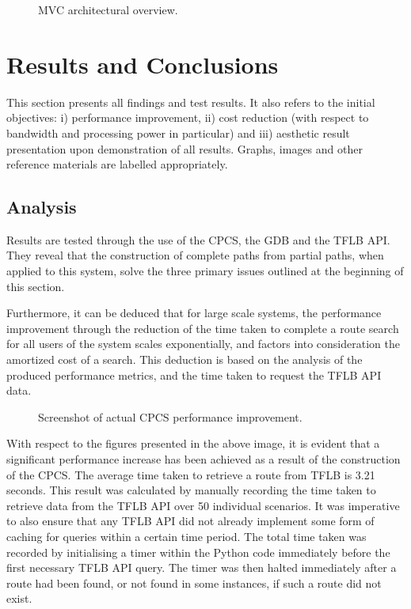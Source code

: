\documentclass[12pt]{article}   	%
\begin{document}
\noindent
\hfill
\begin{figure}[htp]

\caption{MVC architectural overview.}
\end{figure}
\hfill

\newpage

\section{Results and Conclusions}
This section presents all findings and test results. It also refers to the initial objectives: i) performance improvement, ii) cost reduction (with respect to bandwidth and processing power in particular) and iii) aesthetic result presentation upon demonstration of all results. Graphs, images and other reference materials are labelled appropriately.

\subsection{Analysis}
Results are tested through the use of the CPCS, the GDB and the TFLB API. They reveal that the construction of complete paths from partial paths, when applied to this system, solve the three primary issues outlined at the beginning of this section.
	
Furthermore, it can be deduced that for large scale systems, the performance improvement through the reduction of the time taken to complete a route search for all users of the system scales exponentially, and factors into consideration the amortized cost of a search. This deduction is based on the analysis of the produced performance metrics, and the time taken to request the TFLB API data.

\noindent
\hfill
\begin{figure}[htp]

\caption{Screenshot of actual CPCS performance improvement.}
\end{figure}
\hfill

\noindent
With respect to the figures presented in the above image, it is evident that a significant performance increase has been achieved as a result of the construction of the CPCS. The average time taken to retrieve a route from TFLB is 3.21 seconds. This result was calculated by manually recording the time taken to retrieve data from the TFLB API over 50 individual scenarios. It was imperative to also ensure that any TFLB API did not already implement some form of caching for queries within a certain time period. The total time taken was recorded by initialising a timer within the Python code immediately before the first necessary TFLB API query. The timer was then halted immediately after a route had been found, or not found in some instances, if such a route did not exist.
\end{document}
